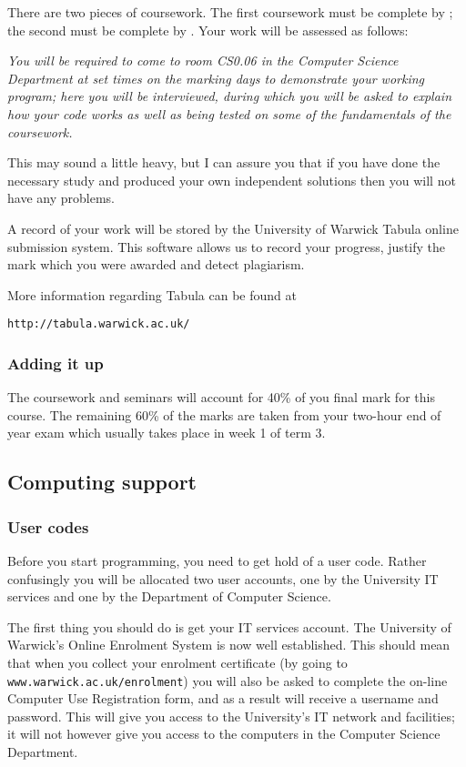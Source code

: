 There are two pieces of coursework. The first coursework must be complete 
by \deadlineone; the second must be complete by 
\deadlinetwo. Your work will be assessed as follows:

{\it You will be required to come to room CS0.06 in the Computer Science 
Department at set times on the marking days to demonstrate 
your working program; here you will be interviewed, during which you will 
be asked to explain how your code works
as well as being tested on some of the fundamentals of the coursework.}

This may sound a little heavy, but I can assure you that if you have done 
the necessary study and produced your own independent solutions then you will not 
have any problems.

A record of your work will be stored by the University of Warwick 
Tabula online submission system. This software allows us to record your 
progress, justify the mark which you were awarded and detect plagiarism.

More information regarding Tabula can be found at 

{\tt http://tabula.warwick.ac.uk/}

\subsubsection{Adding it up}

The coursework and seminars will account for 40\% of you final 
mark for this course. The remaining 60\% of the marks are taken from your 
two-hour end of year exam which usually takes place in week 1 of term 3.

\subsection{Computing support}

\subsubsection{User codes}

Before you start programming, you need to get hold of a user code. 
Rather confusingly you will be allocated two user accounts, one by the 
University IT services and one by the Department of Computer 
Science.
 
The first thing you should do is get your IT services account.
The University of Warwick's Online Enrolment System is now well established.  
This should mean that when you collect your enrolment
certificate (by going to {\tt www.warwick.ac.uk/enrolment}) you will also be asked to complete the on-line Computer
Use Registration form, and as a result will receive a username and password. 
This will give you access to the University's IT network and facilities; it 
will not however give you access to the computers in the Computer Science
Department. 
 
